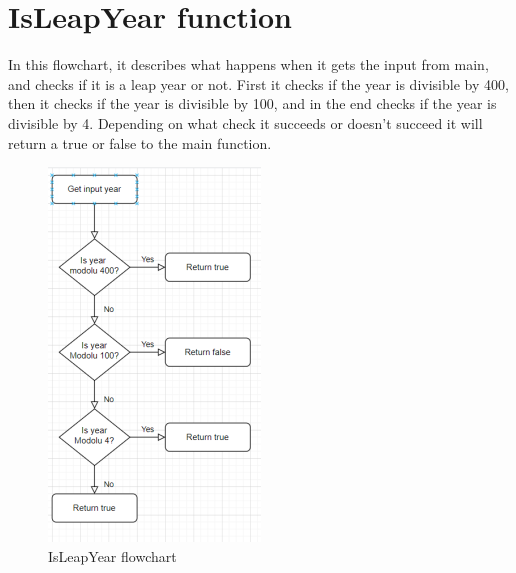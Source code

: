 \documentclass{article}
\begin{document}
\section{IsLeapYear function}

In this flowchart, it describes what happens when it gets the input from main, and checks if it is a leap year or not. First it checks if the year is divisible by 400, then it checks if the year is divisible by 100, and in the end checks if the year is divisible by 4. Depending on what check it succeeds or doesn't succeed it will return a true or false to the main function.

\begin{figure}[ht]
    \centering
    \includegraphics[scale=0.6]{Pictures/IsLeapYear flowchart.png}
    \caption{IsLeapYear flowchart}
    \label{fig:IsLeapYear}
\end{figure}
\end{document}
